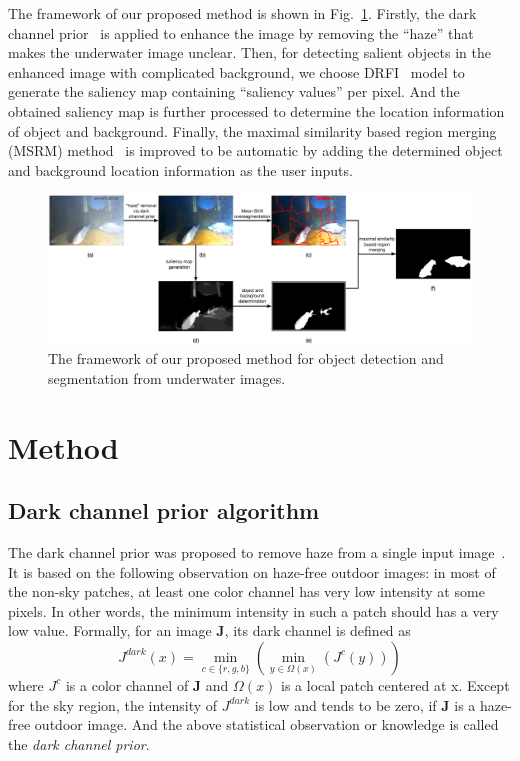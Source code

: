 \documentclass[conference]{IEEEtran}
\begin{document}

The framework of our proposed method is shown in Fig.~\ref{fig:flowchart}. Firstly, the dark channel prior~\cite{he2011single} is applied to enhance the image by removing the ``haze'' that makes the underwater image unclear. Then, for detecting salient objects in the enhanced image with complicated background, we choose DRFI~\cite{jiang2013salient} model to generate the saliency map containing ``saliency values'' per pixel. And the obtained saliency map is further processed to determine the location information of object and background. Finally, the maximal similarity based region merging (MSRM) method~\cite{ning2010interactive} is improved to be automatic by adding the determined object and background location information as the user inputs. 

\begin{figure}[t]
\centerline{\includegraphics[width=\textwidth]{figures/flowchart.eps}}
\caption{The framework of our proposed method for object detection and segmentation from underwater images.}
\label{fig:flowchart}
\end{figure} 

\section{Method}

\subsection{Dark channel prior algorithm}
The dark channel prior was proposed to remove haze from a single input image~\cite{he2011single}. It is based on the following observation on haze-free outdoor images: in most of the non-sky patches, at least one color channel has very low intensity at some pixels. In other words, the minimum intensity in such a patch should has a very low value. Formally, for an image $\mathbf{J}$, its dark channel is defined as
\begin{equation}
J^{dark}(x) = \min_{c\in \{r,g,b\}}(\min_{y\in \Omega(x)}(J^c(y)))
\end{equation}
where $J^c$ is a color channel of $\mathbf{J}$ and $\Omega(x)$ is a local patch centered at x. Except for the sky region, the intensity of $J^{dark}$ is low and tends to be zero, if \textbf{J} is a haze-free outdoor image. And the above statistical observation or knowledge is called the \textit{dark channel prior}.
\end{document}
